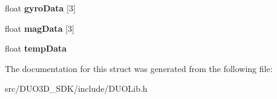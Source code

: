 \begin{DoxyCompactItemize}
\item 
float {\bfseries gyro\+Data} \mbox{[}3\mbox{]}\hypertarget{struct_d_u_o_frame_a38e8d904ce94edddcb7432972e126b1b}{}\label{struct_d_u_o_frame_a38e8d904ce94edddcb7432972e126b1b}

\item 
float {\bfseries mag\+Data} \mbox{[}3\mbox{]}\hypertarget{struct_d_u_o_frame_ace2706c4cca43e7e13793f3ee5d54d70}{}\label{struct_d_u_o_frame_ace2706c4cca43e7e13793f3ee5d54d70}

\item 
float {\bfseries temp\+Data}\hypertarget{struct_d_u_o_frame_a1bc9915b390e052d071c1421eeda164d}{}\label{struct_d_u_o_frame_a1bc9915b390e052d071c1421eeda164d}

\end{DoxyCompactItemize}


The documentation for this struct was generated from the following file\+:\begin{DoxyCompactItemize}
\item 
src/\+D\+U\+O3\+D\+\_\+\+S\+D\+K/include/D\+U\+O\+Lib.\+h\end{DoxyCompactItemize}
